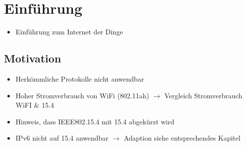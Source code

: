 \section{Einführung}
\begin{itemize}
	\item Einführung zum Internet der Dinge	
\end{itemize}

\subsection{Motivation}
\begin{itemize}
	\item Herkömmliche Protokolle nicht anwendbar	
	\item Hoher Stromverbrauch von WiFi (802.11ah) $\rightarrow$ Vergleich Stromverbrauch WiFI \& 15.4
	\item Hinweis, dass IEEE802.15.4 mit 15.4 abgekürzt wird
	\item IPv6 nicht auf 15.4 anwendbar $\rightarrow$ Adaption siehe entsprechendes Kapitel
\end{itemize}
  
 
